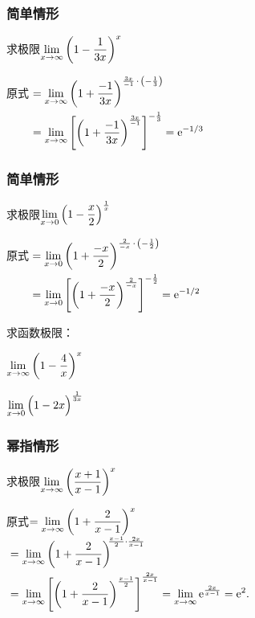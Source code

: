 \documentclass[14pt,notheorems,leqno,xcolor={rgb}]{beamer} %
\begin{document}
\begin{frame}
\frametitle{简单情形}
\begin{example}
求极限$\lim\limits_{x\to\infty}\left(1-\dfrac1{3x}\right)^x$
\end{example}
\pause
\begin{solution}
原式\unskip$\begin{aligned}[t]
&=\lim\limits_{x\to\infty}\left(1+\dfrac{-1}{3x}\right)^{\frac{3x}{-1}\,\cdot\,\left(-\frac13\right)}\\
&=\lim\limits_{x\to\infty}\left[\left(1+\dfrac{-1}{3x}\right)^{\frac{3x}{-1}}\right]^{-\frac13}=\mathrm{e}^{-1/3}
\end{aligned}$
\end{solution}
\end{frame}

\begin{frame}
\frametitle{简单情形}
\begin{example}
求极限$\lim\limits_{x\to0}\left(1-\dfrac{x}2\right)^{\frac1x}$
\end{example}
\pause
\begin{solution}
原式\unskip$\begin{aligned}[t]
&=\lim\limits_{x\to0}\left(1+\dfrac{-x}{2}\right)^{\frac{2}{-x}\,\cdot\,\left(-\frac12\right)}\\
&=\lim\limits_{x\to0}\left[\left(1+\dfrac{-x}{2}\right)^{\frac{2}{-x}}\right]^{-\frac12}=\mathrm{e}^{-1/2}
\end{aligned}$
\end{solution}
\end{frame}

\begin{frame}
\begin{exercise}求函数极限：
\begin{enumlite}
  \item $\lim\limits_{x\to\infty}\left(1-\dfrac4{x}\right)^x$
  \item $\lim\limits_{x\to0}\Big(1-2x\Big)^{\frac1{3x}}$
\end{enumlite}
\end{exercise}
\end{frame}

\begin{frame}
\frametitle{幂指情形}
\begin{example}
求极限$\lim\limits_{x\to\infty}\left(\dfrac{x+1}{x-1}\right)^x$
\end{example}
\pause
\begin{solution}
原式$=\lim\limits_{x\to\infty}\left(1+\dfrac2{x-1}\right)^x$\\
$\begin{aligned}[t]
&=\lim_{x\to\infty}\left(1+\dfrac2{x-1}\right)^{\!\!\frac{x-1}2\cdot\frac{2x}{x-1}}\\
&=\lim_{x\to\infty}\left[\left(1+\dfrac2{x-1}\right)^{\frac{x-1}2}\right]^{\frac{2x}{x-1}}
 =\lim_{x\to\infty}\mathrm{e}^{\frac{2x}{x-1}}=\mathrm{e}^2.
\end{aligned}$
\end{solution}
\end{frame}
\end{document}
